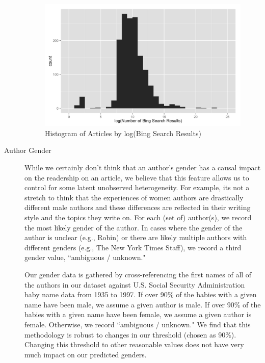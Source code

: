 \documentclass[fleqn,12pt]{SelfArx} %
\begin{document}
\begin{description}
\begin{figure}[ht]\centering
\includegraphics[width=\linewidth]{author_popularity_log_histogram.png}
\caption{Histogram of Articles by log(Bing Search Results)}
\label{fig:apl_hist}
\end{figure}
	
	\item[Author Gender] While we certainly don't think that an author's gender has a causal impact on the readership on an article, we believe that this feature allows us to control for some latent unobserved heterogeneity. For example, its not a stretch to think that the experiences of women authors are drastically different male authors and these differences are reflected in their writing style and the topics they write on. For each (set of) author(s), we record the most likely gender of the author. In cases where the gender of the author is unclear (e.g., Robin) or there are likely multiple authors with different genders (e.g., The New York Times Staff), we record a third gender value, ``ambiguous / unknown." 
	
	Our gender data is gathered by cross-referencing the first names of all of the authors in our dataset against U.S. Social Security Administration baby name data from 1935 to 1997. If over 90\% of the babies with a given name have been male, we assume a given author is male. If over 90\% of the babies with a given name have been female, we assume a given author is female. Otherwise, we record ``ambiguous / unknown." We find that this methodology is robust to changes in our threshold (chosen as 90\%). Changing this threshold to other reasonable values does not have very much impact on our predicted genders.
	

\end{description}
\end{document}
